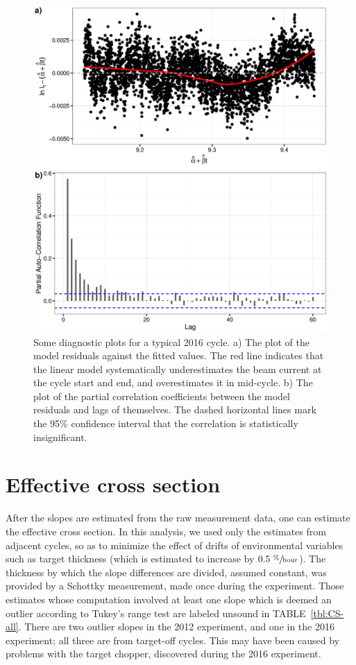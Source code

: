 \documentclass[reprint, superscriptaddress]{revtex4-1}
\newcommand{\scl}{.4}
\begin{document}
\begin{figure}
\centering
\includegraphics[scale=\scl]{img/DiagPlot_969.eps}
\caption{Some diagnostic plots for a typical 2016 cycle. a) The plot of the model residuals against the fitted values. The red line indicates that the linear model systematically underestimates the beam current at the cycle start and end, and overestimates it in mid-cycle. b) The plot of the partial correlation coefficients between the model residuals and lags of themselves. The dashed horizontal lines mark the 95\% confidence interval that the correlation is statistically insignificant.\label{fig:Run969}}
\end{figure}

\section{Effective cross section}
After the slopes are estimated from the raw measurement data, one can estimate the effective cross section. In this analysis, we used only the estimates from adjacent cycles, so as to minimize the effect of drifts of environmental variables such as target thickness (which is estimated to increase by $0.5~ \sfrac{\%}{\mathrm{hour}}$). The thickness by which the slope differences are divided, assumed constant, was provided by a Schottky measurement, made once during the experiment. Those estimates whose computation involved at least one slope which is deemed an outlier according to Tukey's range test are labeled unsound in TABLE~\ref{tbl:CS-all}. There are two outlier slopes in the 2012 experiment, and one in the 2016 experiment; all three are from target-off cycles. This may have been caused by problems with the target chopper, discovered during the 2016 experiment.
\end{document}

